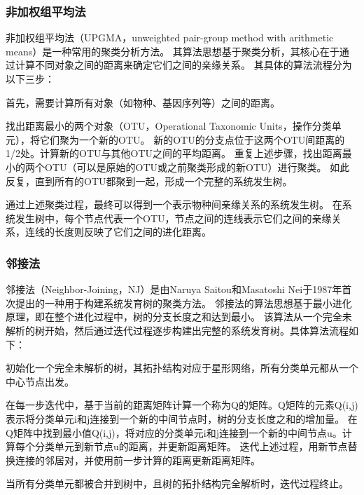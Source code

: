 \documentclass{article}
\begin{document}
\begin{multicols}{2}
\subsubsection{非加权组平均法}
\par
非加权组平均法（UPGMA，unweighted pair-group method with arithmetic means）是一种常用的聚类分析方法。
其算法思想基于聚类分析，其核心在于通过计算不同对象之间的距离来确定它们之间的亲缘关系\cite{ref3}。
其具体的算法流程分为以下三步：
\par
首先，需要计算所有对象（如物种、基因序列等）之间的距离。
\par
找出距离最小的两个对象（OTU，Operational Taxonomic Units，操作分类单元），将它们聚为一个新的OTU。
新的OTU的分支点位于这两个OTU间距离的1/2处。计算新的OTU与其他OTU之间的平均距离。
重复上述步骤，找出距离最小的两个OTU（可以是原始的OTU或之前聚类形成的新OTU）进行聚类。
如此反复，直到所有的OTU都聚到一起，形成一个完整的系统发生树。
\par
通过上述聚类过程，最终可以得到一个表示物种间亲缘关系的系统发生树。
在系统发生树中，每个节点代表一个OTU，节点之间的连线表示它们之间的亲缘关系，连线的长度则反映了它们之间的进化距离。

\subsubsection{邻接法}
\par
邻接法（Neighbor-Joining，NJ）是由Naruya Saitou和Masatoshi Nei于1987年首次提出的一种用于构建系统发育树的聚类方法\cite{ref5}。
邻接法的算法思想基于最小进化原理，即在整个进化过程中，树的分支长度之和达到最小。
该算法从一个完全未解析的树开始，然后通过迭代过程逐步构建出完整的系统发育树。具体算法流程如下：
\par
初始化一个完全未解析的树，其拓扑结构对应于星形网络，所有分类单元都从一个中心节点出发。
\par
在每一步迭代中，基于当前的距离矩阵计算一个称为Q的矩阵。Q矩阵的元素Q(i,j)表示将分类单元i和j连接到一个新的中间节点时，树的分支长度之和的增加量。
在Q矩阵中找到最小值Q(i,j)，将对应的分类单元i和j连接到一个新的中间节点u。计算每个分类单元到新节点u的距离，并更新距离矩阵。
迭代上述过程，用新节点替换连接的邻居对，并使用前一步计算的距离更新距离矩阵。
\par
当所有分类单元都被合并到树中，且树的拓扑结构完全解析时，迭代过程终止。


\end{multicols}
\end{document}
